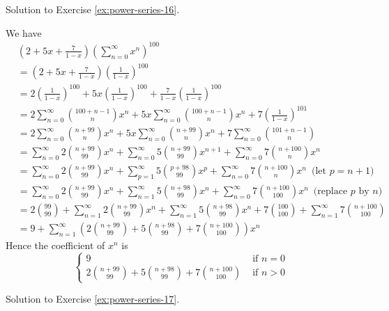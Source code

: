 \newpage

Solution to Exercise \ref{ex:power-series-16}.


We have
\begin{align*}
&\left( 
2 + 5x + \frac{7}{1 - x}
\right)
\left( \sum_{n=0}^\infty x^n \right)^{100}
\\
&= \left( 
2 + 5x + \frac{7}{1 - x}
\right)
\left( \frac{1}{1 - x} \right)^{100}
\\
&=
2\left( \frac{1}{1 - x} \right)^{100}
+ 5x \left( \frac{1}{1 - x} \right)^{100}
+ \frac{7}{1 - x} \left( \frac{1}{1 - x} \right)^{100}
\\
&=
2 \sum_{n=0}^\infty \binom{100 + n - 1}{n} x^n
+ 5x \sum_{n=0}^\infty \binom{100 + n - 1}{n} x^n
+ 7 \left( \frac{1}{1 - x} \right)^{101} 
\\
&=
2 \sum_{n=0}^\infty \binom{n + 99}{n} x^n
+ 5x \sum_{n=0}^\infty \binom{n + 99}{n} x^n
+ 7 \sum_{n=0}^\infty \binom{101 + n - 1}{n}
\\
&=
\sum_{n=0}^\infty 2 \binom{n + 99}{99} x^n
+ \sum_{n=0}^\infty 5 \binom{n + 99}{99} x^{n+1}
+ \sum_{n=0}^\infty 7 \binom{n + 100}{n} x^n
\\
&=
\sum_{n=0}^\infty 2 \binom{n + 99}{99} x^n
+ \sum_{p=1}^\infty 5 \binom{p + 98}{99} x^{p}
+ \sum_{n=0}^\infty 7          \binom{n + 100}{n} x^n  \,\,\, \text{(let $p = n + 1$)}
\\
&=
\sum_{n=0}^\infty 2\binom{n + 99}{99} x^n
+ \sum_{n=1}^\infty 5 \binom{n + 98}{99} x^{n}  
+ \sum_{n=0}^\infty 7 \binom{n + 100}{100} x^n \,\,\,\text{(replace $p$ by $n$)}
\\
&=
2 \binom{99}{99} + \sum_{n=1}^\infty 2\binom{n + 99}{99} x^n
+ \sum_{n=1}^\infty 5\binom{n + 98}{99} x^{n} 
+ 7\binom{100}{100}  + \sum_{n=1}^\infty 7 \binom{n + 100}{100}  
\\
&=
9 +
\sum_{n=1}^\infty
\left( 2\binom{n + 99}{99} 
+  5\binom{n + 98}{99} 
+ 7 \binom{n + 100}{100}
\right) x^n
\end{align*}
Hence the coefficient of $x^n$ is
\[
\begin{cases}
9 & \text{ if } n = 0 \\
\displaystyle 2\binom{n + 99}{99} 
+  5\binom{n + 98}{99} 
+ 7 \binom{n + 100}{100} & \text{ if } n > 0
\end{cases}
\]


\newpage

Solution to Exercise \ref{ex:power-series-17}.

